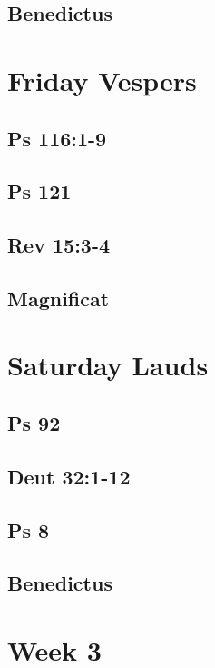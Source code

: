 \subsection{Benedictus}


\section{Friday Vespers}

\subsection{Ps 116:1-9}

\subsection{Ps 121}

\subsection{Rev 15:3-4}

\subsection{Magnificat}


\section{Saturday Lauds}

\subsection{Ps 92}

\subsection{Deut 32:1-12}

\subsection{Ps 8}

\subsection{Benedictus}



\section{Week 3}


